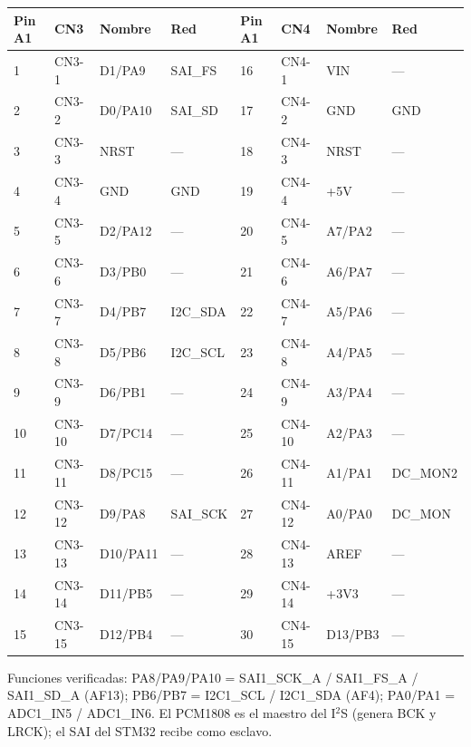 \documentclass[10pt,a4paper]{article}
\begin{document}
\par\begin{center}\footnotesize\begin{tabular}{@{}llll|llll@{}}\toprule
\textbf{Pin A1} & \textbf{CN3} & \textbf{Nombre} & \textbf{Red} & \textbf{Pin A1} & \textbf{CN4} & \textbf{Nombre} & \textbf{Red}\\\midrule
1 & CN3-1 & D1/PA9 & SAI\_\allowbreak{}FS & 16 & CN4-1 & VIN & —\\
2 & CN3-2 & D0/PA10 & SAI\_\allowbreak{}SD & 17 & CN4-2 & GND & GND\\
3 & CN3-3 & NRST & — & 18 & CN4-3 & NRST & —\\
4 & CN3-4 & GND & GND & 19 & CN4-4 & +5V & —\\
5 & CN3-5 & D2/PA12 & — & 20 & CN4-5 & A7/PA2 & —\\
6 & CN3-6 & D3/PB0 & — & 21 & CN4-6 & A6/PA7 & —\\
7 & CN3-7 & D4/PB7 & I2C\_\allowbreak{}SDA & 22 & CN4-7 & A5/PA6 & —\\
8 & CN3-8 & D5/PB6 & I2C\_\allowbreak{}SCL & 23 & CN4-8 & A4/PA5 & —\\
9 & CN3-9 & D6/PB1 & — & 24 & CN4-9 & A3/PA4 & —\\
10 & CN3-10 & D7/PC14 & — & 25 & CN4-10 & A2/PA3 & —\\
11 & CN3-11 & D8/PC15 & — & 26 & CN4-11 & A1/PA1 & DC\_\allowbreak{}MON2\\
12 & CN3-12 & D9/PA8 & SAI\_\allowbreak{}SCK & 27 & CN4-12 & A0/PA0 & DC\_\allowbreak{}MON\\
13 & CN3-13 & D10/PA11 & — & 28 & CN4-13 & AREF & —\\
14 & CN3-14 & D11/PB5 & — & 29 & CN4-14 & +3V3 & —\\
15 & CN3-15 & D12/PB4 & — & 30 & CN4-15 & D13/PB3 & —\\
\bottomrule\end{tabular}\end{center}
\par Funciones verificadas: PA8/PA9/PA10 = SAI1\_SCK\_A / SAI1\_FS\_A / SAI1\_SD\_A (AF13);
PB6/PB7 = I2C1\_SCL / I2C1\_SDA (AF4); PA0/PA1 = ADC1\_IN5 / ADC1\_IN6. El PCM1808 es el maestro del
I$^2$S (genera BCK y LRCK); el SAI del STM32 recibe como esclavo.
\end{document}
